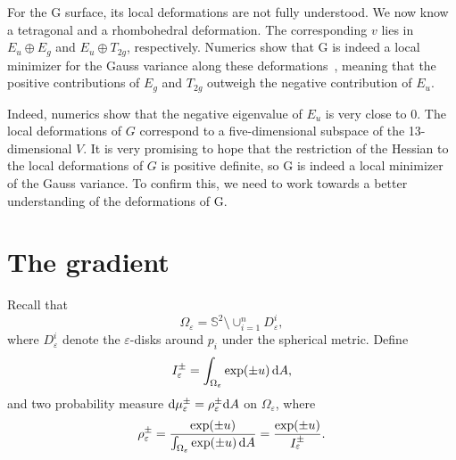 \documentclass[a4paper]{amsart}
\newcommand{\uS}{\mathbb{S}}
\newcommand{\dd}{{\rm d}}
\theoremstyle{plain} %
\theoremstyle{definition} %
\theoremstyle{remark}
\begin{document}
For the G surface, its local deformations are not fully understood.  We now
know a tetragonal and a rhombohedral deformation.  The corresponding $v$ lies
in $E_u \oplus E_g$ and $E_u \oplus T_{2g}$, respectively.  Numerics show that
G is indeed a local minimizer for the Gauss variance along these
deformations~\cite{schroderturk2006}, meaning that the positive contributions of
$E_g$ and $T_{2g}$ outweigh the negative contribution of $E_u$.

Indeed, numerics show that the negative eigenvalue of $E_u$ is very close to
$0$.  The local deformations of $G$ correspond to a five-dimensional subspace
of the 13-dimensional $V$.  It is very promising to hope that the restriction
of the Hessian to the local deformations of $G$ is positive definite, so G is
indeed a local minimizer of the Gauss variance.  To confirm this, we need to
work towards a better understanding of the deformations of G.




\appendix

\section{The gradient}
\label{app:gradient}

Recall that
\[
	\Omega_\varepsilon = \uS^2 \setminus \cup_{i=1}^n D^i_\varepsilon,
\]
where $D^i_\varepsilon$ denote the $\varepsilon$-disks around $p_i$ under the
spherical metric.  Define
\[
	I^\pm_\varepsilon = \int_{\Omega_\varepsilon} \exp(\pm u) \, \dd A,
\]
and two probability measure $\dd\mu^\pm_\varepsilon = \rho^\pm_\varepsilon \dd
A$ on $\Omega_\varepsilon$, where
\[
	\rho_\varepsilon^\pm
	= \frac{\exp(\pm u)}{\int_{\Omega_\varepsilon} \exp(\pm u) \, \dd A}
	= \frac{\exp(\pm u)}{I^\pm_\varepsilon}.
\]
\end{document}
